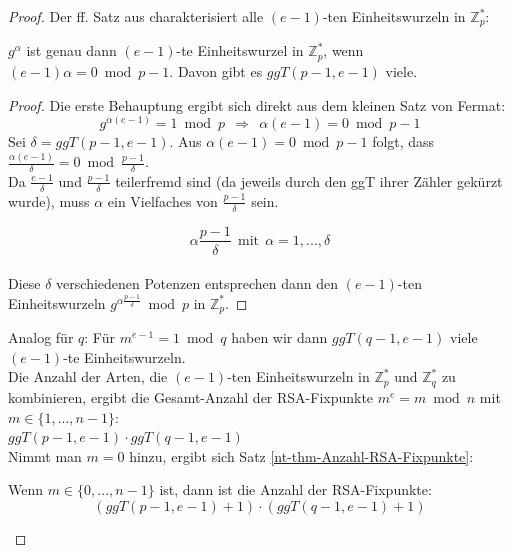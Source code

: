 \begin{refsegment}
\begin{proof}{}
 Der ff. Satz aus \cite[S. 69]{Katzenbeisser2001} charakterisiert alle $(e-1)$-ten Einheitswurzeln in $\mathbb{Z}_p^{*}$:

\begin{satz}\label{nt-katzenbeisser-Anzahl-Einheitswurzeln}
  $g^{\alpha}$ ist genau dann $(e-1)$-te Einheitswurzel in $\mathbb{Z}_p^{*}$,
  wenn $(e-1)\alpha = 0\bmod p-1.$ Davon gibt es $ggT(p-1, e-1)$ viele.
\end{satz}

\begin{proof}{}%
Die erste Behauptung ergibt sich direkt aus dem kleinen Satz von Fermat:
\[g^{\alpha (e-1)}= 1 \bmod p  ~~\Rightarrow~~ \alpha (e-1) = 0\bmod p-1 \]
 Sei $\delta =ggT(p-1, e-1)$. Aus $\alpha (e-1) = 0\bmod p-1$ folgt, dass $\frac{\alpha (e-1)}{\delta}= 0 \bmod \frac{p-1}{\delta}$.\\
Da $\frac {e-1}{\delta}$ und $\frac{p-1}{\delta}$ teilerfremd sind (da jeweils durch
den ggT ihrer Zähler gekürzt wurde), muss $\alpha$ ein Vielfaches von $\frac{p-1}{\delta}$ sein.

\[ \alpha \frac{p-1}{\delta} ~~ \text{mit} ~~ \alpha = 1,...,\delta
\]\\
Diese $\delta$ verschiedenen Potenzen entsprechen dann den
$(e-1)$-ten Einheitswurzeln $g^{\alpha \frac{p-1}{\delta}} \bmod p$ in $\mathbb{Z}_p^{*}$.
\end{proof}


 Analog für $q$: Für $m^{e-1} = 1 \bmod q $ haben wir dann $ ggT(q-1, e-1) $
viele $(e-1)$-te Einheitswurzeln.\\

 Die Anzahl der Arten, die $(e-1)$-ten Einheitswurzeln in $\mathbb{Z}_p^{*}$ und
$\mathbb{Z}_q^{*}$ zu kombinieren, ergibt die Gesamt-Anzahl der RSA-Fixpunkte
$ m^e = m \bmod n$ mit $ m \in \{1,...,n-1\}$:\\
 $ggT(p-1, e-1) \cdot ggT(q-1, e-1) $\\


 Nimmt man $m=0$ hinzu, ergibt sich Satz \ref{nt-thm-Anzahl-RSA-Fixpunkte}:
\begin{satz}\label{nt-thm-Anzahl-RSA-Fixpunkte}
Wenn $ m \in \{0,...,n-1\}$ ist, dann ist die Anzahl der RSA-Fixpunkte:
          \[ (ggT(p-1, e-1)+1) \cdot (ggT(q-1, e-1)+1) \]
\end{satz}


\end{proof}
\end{refsegment}
